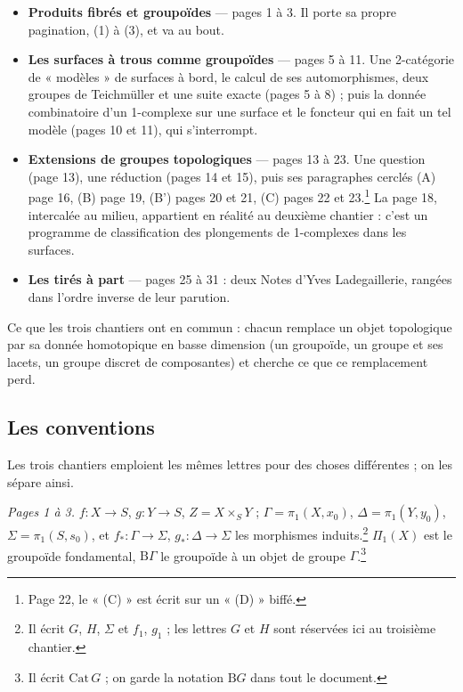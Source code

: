 \documentclass[11pt,a4paper]{article}
\begin{document}
\begin{itemize}
\item \textbf{Produits fibrés et groupoïdes} — pages 1 à 3. Il porte sa
propre pagination, (1) à (3), et va au bout.
\item \textbf{Les surfaces à trous comme groupoïdes} — pages 5 à 11. Une
2-catégorie de « modèles » de surfaces à bord, le calcul de ses
automorphismes, deux groupes de Teichmüller et une suite exacte (pages 5 à
8) ; puis la donnée combinatoire d'un 1-complexe sur une surface et le
foncteur qui en fait un tel modèle (pages 10 et 11), qui s'interrompt.
\item \textbf{Extensions de groupes topologiques} — pages 13 à 23. Une
question (page 13), une réduction (pages 14 et 15), puis ses paragraphes
cerclés (A) page 16, (B) page 19, (B') pages 20 et 21, (C) pages 22 et
23.\footnote{Page 22, le « (C) » est écrit sur un « (D) » biffé.} La page
18, intercalée au milieu, appartient en réalité au deuxième chantier : c'est
un programme de classification des plongements de 1-complexes dans les
surfaces.
\item \textbf{Les tirés à part} — pages 25 à 31 : deux Notes d'Yves
Ladegaillerie, rangées dans l'ordre inverse de leur parution.
\end{itemize}

Ce que les trois chantiers ont en commun : chacun remplace un objet
topologique par sa donnée homotopique en basse dimension (un groupoïde, un
groupe et ses lacets, un groupe discret de composantes) et cherche ce que ce
remplacement perd.

\subsection*{Les conventions}

Les trois chantiers emploient les mêmes lettres pour des choses différentes ;
on les sépare ainsi.

\emph{Pages 1 à 3.} $f : X \to S$, $g : Y \to S$, $Z = X \times_S Y$ ;
$\Gamma = \pi_1(X, x_0)$, $\Delta = \pi_1(Y, y_0)$, $\Sigma = \pi_1(S, s_0)$,
et $f_* : \Gamma \to \Sigma$, $g_* : \Delta \to \Sigma$ les morphismes
induits.\footnote{Il écrit $G$, $H$, $\Sigma$ et $f_1$, $g_1$ ; les lettres
$G$ et $H$ sont réservées ici au troisième chantier.} $\Pi_1(X)$ est le
groupoïde fondamental, $\mathrm{B}\Gamma$ le groupoïde à un objet de groupe
$\Gamma$.\footnote{Il écrit $\mathrm{Cat}\,G$ ; on garde la notation
$\mathrm{B}G$ dans tout le document.}
\end{document}

